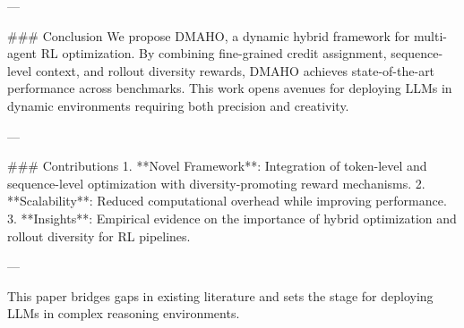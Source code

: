 ---

### Conclusion
We propose DMAHO, a dynamic hybrid framework for multi-agent RL optimization. By combining fine-grained credit assignment, sequence-level context, and rollout diversity rewards, DMAHO achieves state-of-the-art performance across benchmarks. This work opens avenues for deploying LLMs in dynamic environments requiring both precision and creativity.

---

### Contributions
1. **Novel Framework**: Integration of token-level and sequence-level optimization with diversity-promoting reward mechanisms.
2. **Scalability**: Reduced computational overhead while improving performance.
3. **Insights**: Empirical evidence on the importance of hybrid optimization and rollout diversity for RL pipelines.

---

This paper bridges gaps in existing literature and sets the stage for deploying LLMs in complex reasoning environments.